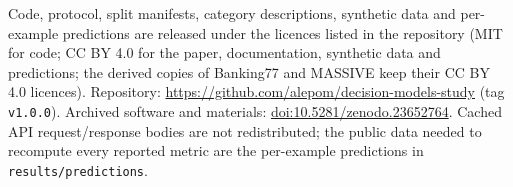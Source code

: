 Code, protocol, split manifests, category descriptions, synthetic data and per-example predictions are released under the licences listed in the repository (MIT for code; CC BY 4.0 for the paper, documentation, synthetic data and predictions; the derived copies of Banking77 and MASSIVE keep their CC BY 4.0 licences). Repository: \url{https://github.com/alepom/decision-models-study} (tag \texttt{v1.0.0}). Archived software and materials: \href{https://doi.org/10.5281/zenodo.23652764}{doi:10.5281/zenodo.23652764}. Cached API request/response bodies are not redistributed; the public data needed to recompute every reported metric are the per-example predictions in \texttt{results/predictions}.
